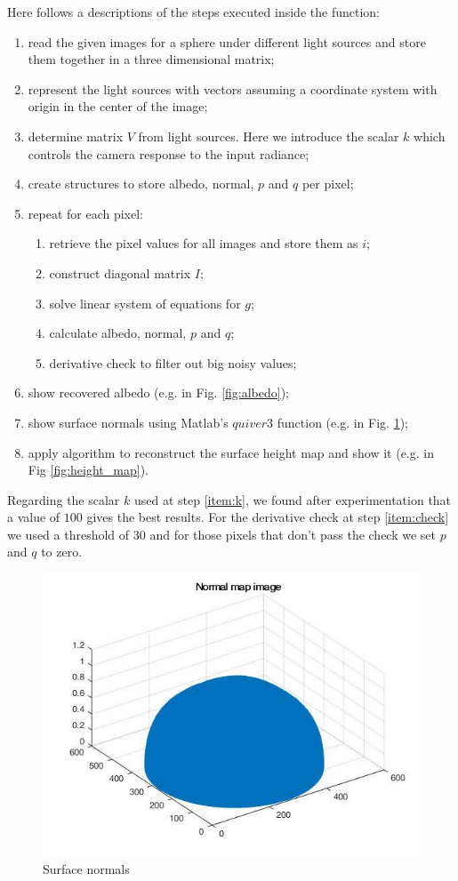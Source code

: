 \documentclass[11pt]{article}
\begin{document}
Here follows a descriptions of the steps executed inside the function:
\begin{enumerate}
	\item read the given images for a sphere under different light sources and store them together in a three dimensional matrix;
	\item represent the light sources with vectors assuming a coordinate system with origin in the center of the image;
	\item \label{item:k} determine matrix $V$ from light sources. Here we introduce the scalar $k$ which controls the camera response to the input radiance;
	\item create structures to store albedo, normal, $p$ and $q$ per pixel;
	\item repeat for each pixel:
	\begin{enumerate}
		\item retrieve the pixel values for all images and store them as $i$;
		\item construct diagonal matrix $I$; 
		\item solve linear system of equations for $g$;
		\item calculate albedo, normal, $p$ and $q$;
		\item \label{item:check} derivative check to filter out big noisy values;
	\end{enumerate}
	\item show recovered albedo (e.g. in Fig. \ref{fig:albedo});
	\item show surface normals using Matlab's $quiver3$ function (e.g. in Fig. \ref{fig:normal_map});
	\item apply algorithm to reconstruct the surface height map and show it (e.g. in Fig \ref{fig:height_map}).
\end{enumerate}

Regarding the scalar $k$ used at step \ref{item:k}, we found after experimentation that a value of $100$ gives the best results.
For the derivative check at step \ref{item:check} we used a threshold of $30$ and for those pixels that don't pass the check we set $p$ and $q$ to zero.


\begin{figure}[H]
    \centering
    \includegraphics[width=.8\textwidth]{normals.jpg}
    \caption{Surface normals}
    \label{fig:normal_map}
\end{figure}
\end{document}
